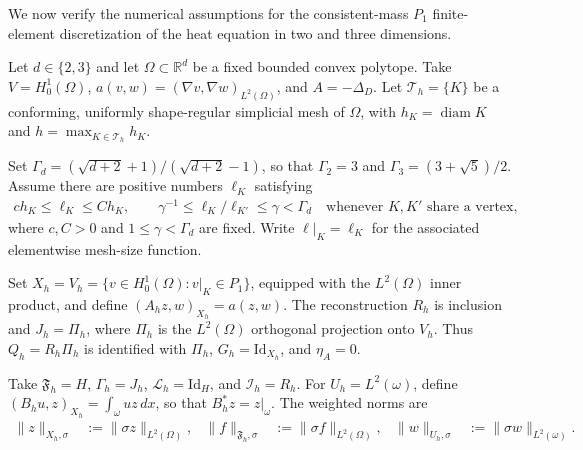 \documentclass[print,wide,eng]{draft}
\begin{document}
We now verify the numerical assumptions for the consistent-mass $P_1$ finite-element discretization of the heat equation in two and three dimensions.

Let $d\in\{2,3\}$ and let $\Omega\subset\mathbb R^d$ be a fixed bounded convex polytope.
Take $V=H_0^1(\Omega)$, $a(v,w)=(\nabla v,\nabla w)_{L^2(\Omega)}$, and $A=-\Delta_D$.
Let $\mathcal T_h=\{K\}$ be a conforming, uniformly shape-regular simplicial mesh of $\Omega$, with $h_K=\operatorname{diam}K$ and $h=\max_{K\in\mathcal T_h}h_K$.

Set $\Gamma_d=(\sqrt{d+2}+1)/(\sqrt{d+2}-1)$, so that $\Gamma_2=3$ and $\Gamma_3=(3+\sqrt5)/2$.
Assume there are positive numbers $\ell_K$ satisfying
%
\begin{align}\label{eq:grading}
ch_K\leq\ell_K\leq Ch_K,\qquad
\gamma^{-1}\leq\ell_K/\ell_{K'}\leq\gamma<\Gamma_d
\quad\text{whenever $K,K'$ share a vertex},
\end{align}
%
where $c,C>0$ and $1\leq\gamma<\Gamma_d$ are fixed.
Write $\ell|_K=\ell_K$ for the associated elementwise mesh-size function.

Set $X_h=V_h=\{v\in H_0^1(\Omega):v|_K\in P_1\}$, equipped with the $L^2(\Omega)$ inner product, and define $(A_hz,w)_{X_h}=a(z,w)$. The reconstruction $R_h$ is inclusion and $J_h=\Pi_h$, where $\Pi_h$ is the $L^2(\Omega)$ orthogonal projection onto $V_h$. Thus $Q_h=R_h\Pi_h$ is identified with $\Pi_h$, $G_h=\mathrm{Id}_{X_h}$, and $\eta_A=0$.

Take $\mathfrak F_h=H$, $\Gamma_h=J_h$, $\mathcal L_h=\mathrm{Id}_H$, and $\mathcal I_h=R_h$. For $U_h=L^2(\omega)$, define $(B_hu,z)_{X_h}=\int_\omega uz\,dx$, so that $B_h^*z=z|_\omega$.
The weighted norms are
%
\begin{align*}
\|z\|_{X_h,\sigma}&:=\|\sigma z\|_{L^2(\Omega)},&
\|f\|_{\mathfrak F_h,\sigma}&:=\|\sigma f\|_{L^2(\Omega)},&
\|w\|_{U_h,\sigma}&:=\|\sigma w\|_{L^2(\omega)}.
\end{align*}
%
\end{document}
